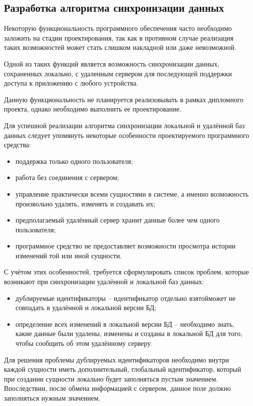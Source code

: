 \subsection{Разработка алгоритма синхронизации данных}
\label{sec:design:sync}

Некоторую функциональность программного обеспечения часто необходимо заложить на стадии проектирования, так как в противном случае реализация таких возможностей может стать слишком накладной или даже невозможной.

Одной из таких функций является возможность синхронизации данных, сохраненных локально, с удаленным сервером для последующей поддержки доступа к приложению с любого устройства.

Данную функциональность не планируется реализовывать в рамках дипломного проекта, однако необходимо выполнить ее проектирование.

Для успешной реализации алгоритма синхронизации локальной и удалённой баз данных следует упомянуть некоторые особенности проектируемого программного средства:
\begin{itemize}
    \item поддержка только одного пользователя;
    \item работа без соединения с сервером;
    \item управление практически всеми сущностями в системе, а именно возможность произвольно удалять, изменять и создавать их;
    \item предполагаемый удалённый сервер хранит данные более чем одного пользователя;
    \item программное средство не предоставляет возможности просмотра истории изменений той или иной сущности.
\end{itemize}

С учётом этих особенностей, требуется сформулировать список проблем, которые возникают при синхронизации удалённой и локальной баз данных:
\begin{itemize}
    \item дублируемые идентификаторы -- идентификатор отдельно взятой может не совпадать в удалённой и локальной версии БД;
    \item определение всех изменений в локальной версии БД -- необходимо знать, какие данные были удалены, изменены и созданы в локальной БД для того, чтобы сообщить об этом удалённому серверу.
\end{itemize}

Для решения проблемы дублируемых идентификаторов необходимо внутри каждой сущности иметь дополнительный, глобальный идентификатор, который при создании сущности локально будет заполняться пустым значением.
Впоследствии, после обмена информацией с сервером, данное поле должно заполняться нужным значением.

